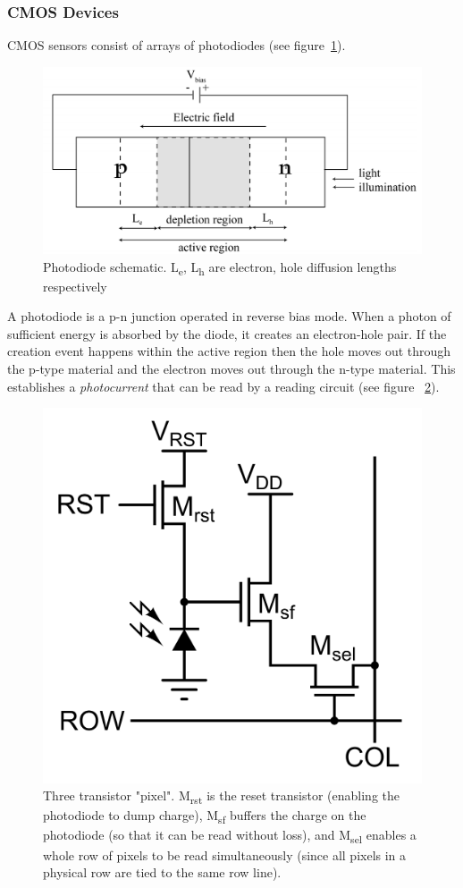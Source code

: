 \subsubsection{CMOS Devices}
CMOS sensors consist of arrays of photodiodes (see figure~\ref{fig:photodiode.png}).
\begin{figure}
	\includegraphics[width=\linewidth,keepaspectratio]{figures/background/photodiode.png}
	\caption{Photodiode schematic. L\textsubscript{e}, L\textsubscript{h} are electron, hole diffusion lengths respectively\cite{Xu2015FundamentalCO}}
	\label{fig:photodiode.png}
\end{figure}
A photodiode is a p-n junction operated in reverse bias mode.
%
When a photon of sufficient energy is absorbed by the diode, it creates an electron-hole pair.
%
If the creation event happens within the active region then the hole moves out through the p-type material and the electron moves out through the n-type material.
%
This establishes a \textit{photocurrent} that can be read by a reading circuit (see figure ~\ref{fig:3tpixel}).
\begin{figure}
	\center
	\includegraphics[width=.5\linewidth,keepaspectratio]{figures/background/3t_pixel.png}
	\caption{Three transistor "pixel". M\textsubscript{rst} is the reset transistor (enabling the photodiode to dump charge), M\textsubscript{sf} buffers the charge on the photodiode (so that it can be read without loss), and M\textsubscript{sel} enables a whole row of pixels to be read simultaneously (since all pixels in a physical row are tied to the same row line).}
	\label{fig:3tpixel}
\end{figure}

